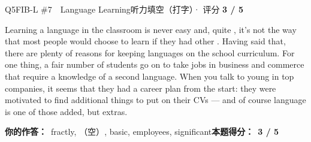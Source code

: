 \begin{qblock}{Q5\quad FIB-L \#7\ \ Language Learning}{听力填空（打字）· 评分 \textcolor{cAccent}{\bfseries 3 / 5}}
\begin{promptbox}
Learning a language in the classroom is never easy and, quite , it's not the way that most people would choose to learn if they had other . Having said that, there are plenty of reasons for keeping languages on the school curriculum. For one thing, a fair number of students go on to take jobs in business and commerce that require a  knowledge of a second language. When you talk to young  in top companies, it seems that they had a career plan from the start: they were motivated to find additional things to put on their CVs --- and of course language is one of those added, but  extras.
\end{promptbox}
\par\smallskip
\textbf{你的作答：}\ {\color{cWrong}fractly}, {\color{cWrong}（空）}, basic, employees, significant\qquad\textbf{本题得分：}\ {\color{cAccent}\bfseries 3 / 5}
\end{qblock}

